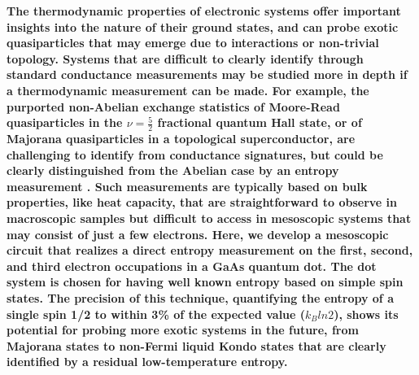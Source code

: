 \documentclass[twocolumn,showpacs,preprintnumbers,amsmath,amssymb,pra,aps,superscriptaddress]{revtex4-1}
\begin{document}
\textbf{The thermodynamic properties of electronic systems offer important insights into the nature of their ground states, and can probe exotic quasiparticles that may emerge due to interactions or non-trivial topology.  Systems that are difficult to clearly identify through standard conductance measurements may be studied more in depth if a thermodynamic measurement can be made. For example, the purported non-Abelian exchange statistics of Moore-Read quasiparticles in the $\nu = \frac{5}{2}$ fractional quantum Hall state, or of Majorana quasiparticles in a topological superconductor, are challenging  to identify from conductance signatures, but could be clearly distinguished from the Abelian case by an entropy measurement \cite{Cooper2009, Smirnov2015}.  Such measurements are typically based on bulk properties, like heat capacity, that are straightforward to observe in macroscopic samples but difficult to access in mesoscopic systems that may consist of just a few electrons.  Here, we develop a mesoscopic circuit that realizes a direct entropy measurement on the first, second, and third electron occupations in a GaAs quantum dot.  The dot system is chosen for having well known entropy based on simple spin states\cite{Tarucha1996, Ciorga2000, Duncan2000, Lindemann2002, Potok2003, Hofmann2016}.  The precision of this technique, quantifying the entropy of a single spin 1/2 to within 3\% of the expected value ($k_B ln 2$), shows its potential for probing more exotic systems in the future, from Majorana states to non-Fermi liquid Kondo states that are clearly identified by a residual low-temperature entropy\cite{Alkurtass2016}.}
\end{document}
